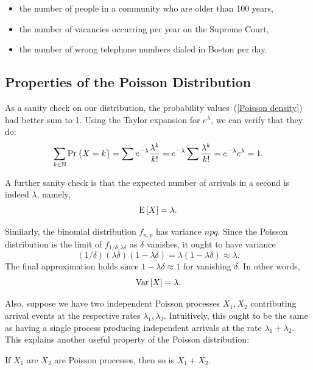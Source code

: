 \documentclass[11pt,twoside]{article}
\begin{document}
\begin{optional}
\begin{itemize}
\item the number of people in a community who are older than 100 years,

\item the number of vacancies occurring per year on the Supreme Court,

\item the number of wrong telephone numbers dialed in Boston per day.

\end{itemize}

\subsection{Properties of the Poisson Distribution}

As a sanity check on our distribution, the probability
values~(\ref{Poisson density}) had better sum to 1.  Using the Taylor
expansion for $e^{\lambda}$, we can verify that they do:
\[
\sum_{k \in \mathbb{N}} \mathop{\textup{Pr}}\nolimits\left\{X=k\right\} = \sum e^{-\lambda}\frac{\lambda^k}{k!}
= e^{-\lambda} \sum \frac{\lambda^k}{k!}
= e^{-\lambda}e^{\lambda} = 1.
\]

A further sanity check is that the expected number of arrivals in a second
is indeed $\lambda$, namely,
\begin{equation}\label{Elam}
\mathop{\textup{E}}\nolimits\left[X\right]= \lambda.
\end{equation}

Similarly, the binomial distribution $f_{n,p}$ has variance
$npq$.  Since the Poisson distribution is the limit
of $f_{1/\delta,\lambda\delta}$ as $\delta$ vanishes, it ought to have
variance
\[
(1/\delta)(\lambda\delta)(1 - \lambda\delta) = \lambda(1 - \lambda\delta)
\approx \lambda.
\]
The final approximation holds since $1 - \lambda\delta \approx 1$ for
vanishing $\delta$.  In other words,
\begin{equation}\label{Vlam}
\mathop{\textup{Var}}\nolimits\left[X\right]= \lambda.
\end{equation}

Also, suppose we have two independent Poisson processes $X_1, X_2$
contributing arrival events at the respective rates $\lambda_1,\lambda_2$.
Intuitively, this ought to be the same as having a single process
producing independent arrivals at the rate $\lambda_1 + \lambda_2$.  This
explains another useful property of the Poisson distribution:
\begin{lemma}\label{lamsum}
If $X_1$ are $X_2$ are Poisson processes, then so is $X_1+X_2$.
\end{lemma}


\end{optional}
\end{document}
